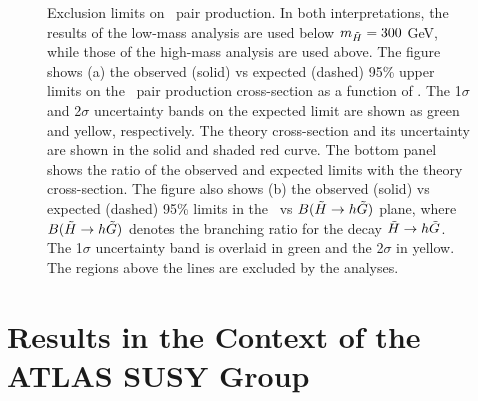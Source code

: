 \begin{figure}[htbp]
	\centering
	\caption{Exclusion limits on \hino\ pair production. In both interpretations, the results of the low-mass analysis are used below $m_{\tilde{H}} = 300$ GeV, while those of the high-mass analysis are used above. The figure shows (a) the observed (solid) vs expected (dashed) 95\% upper limits on the \hino\ pair production cross-section as a function of \mhino.  The 1$\sigma$ and 2$\sigma$ uncertainty bands on the expected limit are shown as green and yellow, respectively. The theory cross-section and its uncertainty are shown in the solid and shaded red curve. The bottom panel shows the ratio of the observed and expected limits with the theory cross-section. The figure also shows (b) the observed (solid) vs expected (dashed) 95\% limits in the \mhino\ vs $B(\tilde{H}\rightarrow h \tilde{G})$ plane, where $B(\tilde{H}\rightarrow h \tilde{G})$ denotes the branching ratio for the decay $\tilde{H} \rightarrow h \tilde{G}$. The 1$\sigma$ uncertainty band is overlaid in green and the 2$\sigma$ in yellow. The regions above the lines are excluded by the analyses.} 
	\label{fig:exclusion}
\end{figure}

\section{Results in the Context of the ATLAS SUSY Group}